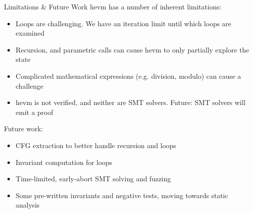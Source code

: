 \documentclass[aspectratio=169]{beamer}
\begin{document}
\begin{frame}[fragile=singleslide]{Limitations \& Future Work}
hevm has a number of inherent limitations:

\begin{itemize}
\item Loops are challenging. We have an iteration limit until which loops are examined
\item Recursion, and parametric calls can cause hevm to only partially explore the state
\item Complicated mathematical expressions (e.g. division, modulo) can cause a challenge
\item hevm is not verified, and neither are SMT solvers. Future: SMT solvers will emit a proof
\end{itemize}
\vspace{2ex}

Future work:
\begin{itemize}
\item CFG extraction to better handle recursion and loops
\item Invariant computation for loops
\item Time-limited, early-abort SMT solving and fuzzing
\item Some pre-written invariants and negative tests, moving towards static analysis
\end{itemize}
\end{frame}

%
%
%
%
\end{document}
